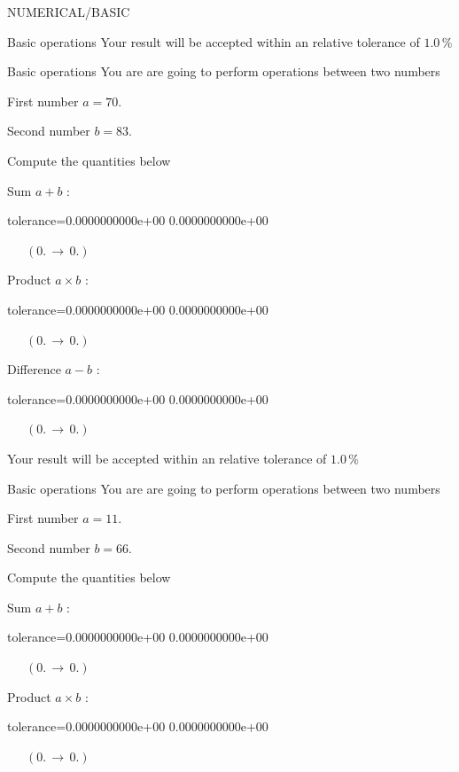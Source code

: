 \documentclass[12pt]{article}
\begin{document}
\begin{quiz}{NUMERICAL/BASIC}
\begin{cloze}{Basic operations}
Your result will be accepted within an relative tolerance of $1.0\, \% $

\end{cloze} 


 \begin{cloze}{Basic operations} 
You are are going to perform operations between two numbers

First number $a = 70.\, $

Second number $b = 83.\, $

 

Compute the quantities below

Sum $ a + b $ : 
\begin{numerical}[points=1] 
\item[tolerance={0.0000000000e+00}] 0.0000000000e+00 
\end{numerical} 
 $\,$ 
 $ \quad (0. \, \rightarrow \, 0.) $ 

Product $ a \times b $ : 
\begin{numerical}[points=1] 
\item[tolerance={0.0000000000e+00}] 0.0000000000e+00 
\end{numerical} 
 $\,$ 
 $ \quad (0. \, \rightarrow \, 0.) $ 

Difference $ a - b $ : 
\begin{numerical}[points=1] 
\item[tolerance={0.0000000000e+00}] 0.0000000000e+00 
\end{numerical} 
 $\,$ 
 $ \quad (0. \, \rightarrow \, 0.) $ 

Your result will be accepted within an relative tolerance of $1.0\, \% $

\end{cloze} 


 \begin{cloze}{Basic operations} 
You are are going to perform operations between two numbers

First number $a = 11.\, $

Second number $b = 66.\, $

 

Compute the quantities below

Sum $ a + b $ : 
\begin{numerical}[points=1] 
\item[tolerance={0.0000000000e+00}] 0.0000000000e+00 
\end{numerical} 
 $\,$ 
 $ \quad (0. \, \rightarrow \, 0.) $ 

Product $ a \times b $ : 
\begin{numerical}[points=1] 
\item[tolerance={0.0000000000e+00}] 0.0000000000e+00 
\end{numerical} 
 $\,$ 
 $ \quad (0. \, \rightarrow \, 0.) $ 


\end{cloze}
\end{quiz}
\end{document}
